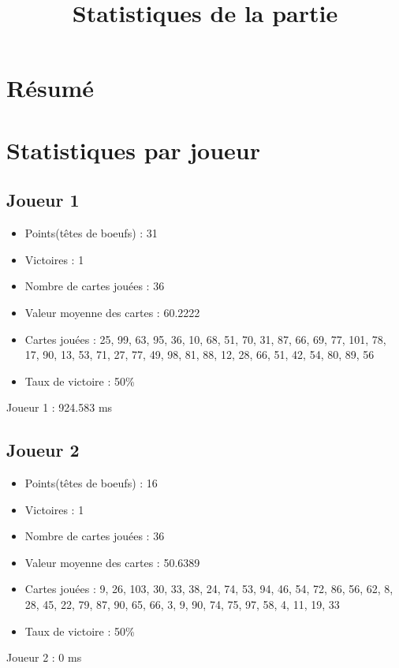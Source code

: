 \documentclass{article}
\title{Statistiques de la partie}
\date{}
\begin{document}
\maketitle
\section*{Résumé}
\section*{Statistiques par joueur}
\subsection*{Joueur 1}
\begin{itemize}
\item Points(têtes de boeufs) : 31
\item Victoires : 1
\item Nombre de cartes jouées : 36
\item Valeur moyenne des cartes : 60.2222
\item Cartes jouées : 25, 99, 63, 95, 36, 10, 68, 51, 70, 31, 87, 66, 69, 77, 101, 78, 17, 90, 13, 53, 71, 27, 77, 49, 98, 81, 88, 12, 28, 66, 51, 42, 54, 80, 89, 56
\item Taux de victoire : 50\%
\end{itemize}
Joueur 1 : 924.583 ms\\
\subsection*{Joueur 2}
\begin{itemize}
\item Points(têtes de boeufs) : 16
\item Victoires : 1
\item Nombre de cartes jouées : 36
\item Valeur moyenne des cartes : 50.6389
\item Cartes jouées : 9, 26, 103, 30, 33, 38, 24, 74, 53, 94, 46, 54, 72, 86, 56, 62, 8, 28, 45, 22, 79, 87, 90, 65, 66, 3, 9, 90, 74, 75, 97, 58, 4, 11, 19, 33
\item Taux de victoire : 50\%
\end{itemize}
Joueur 2 : 0 ms\\
\end{document}
